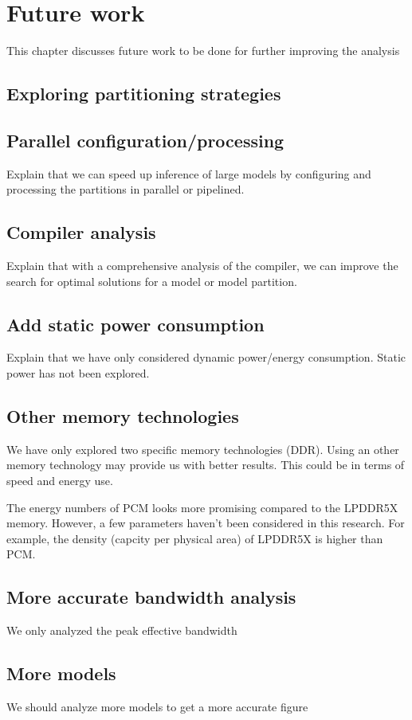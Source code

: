 \section{Future work}
This chapter discusses future work to be done for further improving the analysis

\subsection{Exploring partitioning strategies}


\subsection{Parallel configuration/processing}
Explain that we can speed up inference of large models by configuring and processing the partitions in parallel or pipelined.

\subsection{Compiler analysis}
Explain that with a comprehensive analysis of the compiler, we can improve the search for optimal solutions for a model or model partition.

\subsection{Add static power consumption}
Explain that we have only considered dynamic power/energy consumption.
Static power has not been explored.

\subsection{Other memory technologies}
We have only explored two specific memory technologies (DDR).
Using an other memory technology may provide us with better results.
This could be in terms of speed and energy use.

The energy numbers of PCM looks more promising compared to the LPDDR5X memory.
However, a few parameters haven't been considered in this research.
For example, the density (capcity per physical area) of LPDDR5X is higher than PCM.

\subsection{More accurate bandwidth analysis}
We only analyzed the peak effective bandwidth

\subsection{More models}
We should analyze more models to get a more accurate figure

